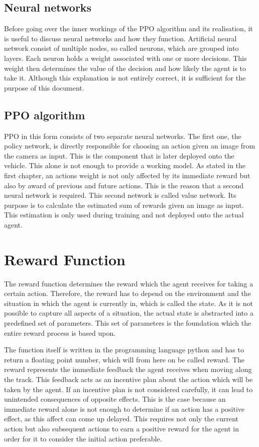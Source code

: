 \subsection{Neural networks}
Before going over the inner workings of the PPO algorithm and its realisation, it is useful to discuss neural networks and how they function. Artificial neural network consist of multiple nodes, so called neurons, which are grouped into layers. Each neuron holds a weight associated with one or more decisions. This weight then determines the value of the decision and how likely the agent is to take it. Although this explanation is not entirely correct, it is sufficient for the purpose of this document.

\subsection{PPO algorithm}
PPO in this form consists of two separate neural networks. The first one, the policy network, is directly responsible for choosing an action given an image from the camera as input. This is the component that is later deployed onto the vehicle. This alone is not enough to provide a working model. As stated in the first chapter, an actions weight is not only affected by its immediate reward but also by award of previous and future actions. This is the reason that a second neural network is required. This second network is called value network. Its purpose is to calculate the estimated sum of rewards given an image as input. This estimation is only used during training and not deployed onto the actual agent.

\section{Reward Function}
The reward function determines the reward which the agent receives for taking a certain action. Therefore, the reward has to depend on the environment and the situation in which the agent is currently in, which is called the state. As it is not possible to capture all aspects of a situation, the actual state is abstracted into a predefined set of parameters. This set of parameters is the foundation which the entire reward process is based upon. 

The function itself is written in the programming language python and has to return a floating point number, which will from here on be called reward. The reward represents the immediate feedback the agent receives when moving along the track. This feedback acts as an incentive plan about the action which will be taken by the agent. If an incentive plan is not considered carefully, it can lead to unintended consequences of opposite effects. This is the case because an immediate reward alone is not enough to determine if an action has a positive effect, as this affect can come up delayed. This requires not only the current action but also subsequent actions to earn a positive reward for the agent in order for it to consider the initial action preferable. 


